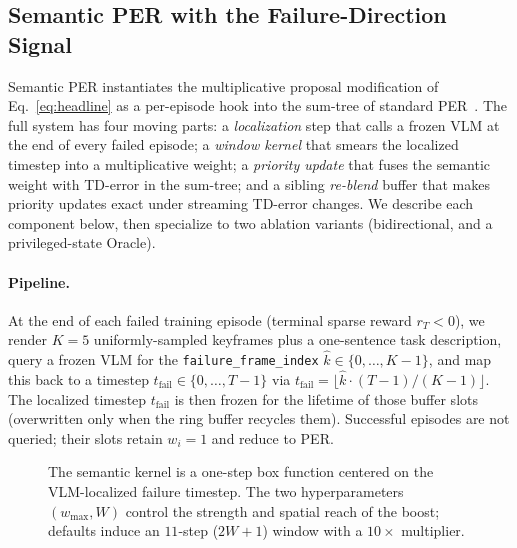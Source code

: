 \documentclass{article}
\begin{document}
\subsection{Semantic PER with the Failure-Direction Signal}
\label{sec:method:sper}

Semantic PER instantiates the multiplicative proposal
modification of Eq.~\eqref{eq:headline} as a per-episode hook into the
sum-tree of standard PER~\citep{schaul2016per}. The full system has four
moving parts: a \emph{localization} step that calls a frozen VLM at the end
of every failed episode; a \emph{window kernel} that smears the localized
timestep into a multiplicative weight; a \emph{priority update} that fuses
the semantic weight with TD-error in the sum-tree; and a sibling
\emph{re-blend} buffer that makes priority updates exact under streaming
TD-error changes. We describe each component below, then specialize to two
ablation variants (bidirectional, and a privileged-state Oracle).

\paragraph{Pipeline.}
At the end of each failed training episode (terminal sparse reward $r_T<0$),
we render $K\!=\!5$ uniformly-sampled keyframes plus a one-sentence task
description, query a frozen VLM for the
\texttt{failure\_frame\_index} $\hat k\!\in\!\{0,\dots,K\!-\!1\}$, and map this
back to a timestep $t_{\text{fail}}\!\in\!\{0,\dots,T\!-\!1\}$ via
$t_{\text{fail}}=\lfloor\hat k\cdot(T\!-\!1)/(K\!-\!1)\rfloor$. The localized
timestep $t_{\text{fail}}$ is then frozen for the lifetime of those buffer
slots (overwritten only when the ring buffer recycles them). Successful
episodes are not queried; their slots retain $w_i\!=\!1$ and reduce to PER.

\begin{figure}[t]
\centering
{}
\caption{The semantic kernel is a one-step box function centered on the
VLM-localized failure timestep. The two hyperparameters $(w_{\max},W)$
control the strength and spatial reach of the boost; defaults induce an
$11$-step ($2W\!+\!1$) window with a $10\!\times$ multiplier.}
\label{fig:kernel}
\end{figure}
\end{document}
